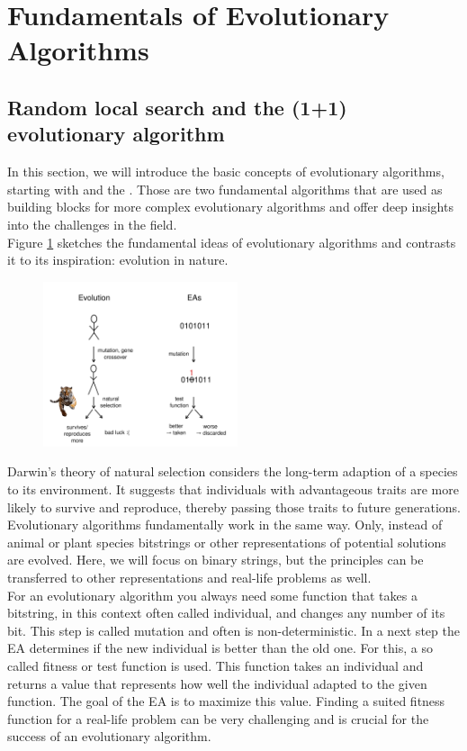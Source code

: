 \section{Fundamentals of Evolutionary Algorithms}

\subsection*{Random local search and the (1+1) evolutionary algorithm}
In this section, we will introduce the basic concepts of evolutionary algorithms, starting with  and the . Those are two fundamental algorithms that are used as building blocks for more complex evolutionary algorithms and offer deep insights into the challenges in the field. \\ 
Figure \ref{fig:EAvsNature} sketches the fundamental ideas of evolutionary algorithms and contrasts it to its inspiration: evolution in nature.  \\
\begin{figure}[H]
  \centering
  \includegraphics[width=0.51\textwidth]{images/evolution_analogy.png}
  \label{fig:EAvsNature}
\end{figure}
Darwin's theory of natural selection considers the long-term adaption of a species to its environment. It suggests that individuals with advantageous traits are more likely to survive and reproduce, thereby passing those traits to future generations.\\ 
Evolutionary algorithms fundamentally work in the same way. Only, instead of animal or plant species bitstrings or other representations of potential solutions are evolved. Here, we will focus on binary strings, but the principles can be transferred to other representations and real-life problems as well. \\
For an evolutionary algorithm you always need some function that takes a bitstring, in this context often called individual, and changes any number of its bit. This step is called mutation and often is non-deterministic. In a next step the EA determines if the new individual is better than the old one. For this, a so called fitness or test function is used. This function takes an individual and returns a value that represents how well the individual adapted to the given function. The goal of the EA is to maximize this value. Finding a suited fitness function for a real-life problem can be very challenging and is crucial for the success of an evolutionary algorithm. \\
